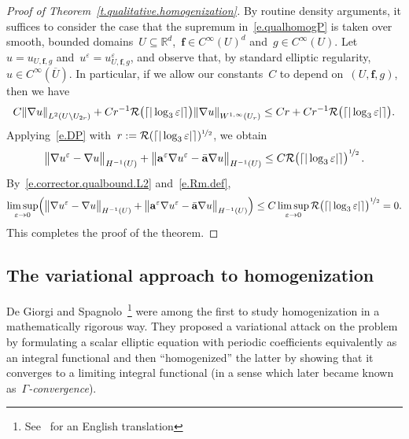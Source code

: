 \documentclass[11pt,twoside]{article} %
\numberwithin{equation}{section}
\theoremstyle{definition}
\let\originalleft\left
\let\originalright\right
\renewcommand{\left}{\mathopen{}\mathclose\bgroup\originalleft}
\renewcommand{\right}{\aftergroup\egroup\originalright}
\newcommand*{\Rd}{\ensuremath{\mathbb{R}^d}}
\newcommand{\eps}{\varepsilon}
\newcommand{\f}{\mathbf{f}}
\newcommand{\ep}{\eps}
\renewcommand{\a}{\mathbf{a}}
\newcommand{\ahom}{\bar{\a}}
\begin{document}
\begin{proof}[{Proof of Theorem~\ref{t.qualitative.homogenization}}]
By routine density arguments, it suffices to consider the case that the supremum in~\eqref{e.qualhomogP} is taken over smooth, bounded domains~$U\subseteq\Rd$,~$\f \in C^\infty(U)^d$ and~$g\in C^\infty(U)$.
Let~$u = u_{U,\f,g}$ and~$u^\ep = u^\ep_{U,\f,g}$, and observe that, by standard elliptic regularity,~$u \in C^\infty(\overline{U})$. In particular, if we allow our constants~$C$ to depend on~$(U,\f,g)$, then we have 
\begin{align*}
C \left\| \nabla u \right\|_{L^{2}(U \setminus U_{2r})} 
+
Cr^{-1} \mathcal{R}\bigl( \lceil |\log_3 \ep| \rceil \bigr) \left\|  \nabla u \right\|_{W^{1,\infty}(U_r)}
\leq 
Cr + Cr^{-1}  \mathcal{R}\bigl( \lceil |\log_3 \ep| \rceil \bigr).
\end{align*}
Applying~\eqref{e.DP} with~$r:= \mathcal{R}(\lceil |\log_3 \ep |\rceil)^{\nicefrac12}$, we obtain 
\begin{align*}
\bigl\| \nabla u^\ep  -\nabla u  \bigr\|_{H^{-1}(U)}
+
\bigl\| \a^\ep \nabla u^\ep  - \ahom \nabla u  \bigr\|_{H^{-1}(U)}
\leq 
C \mathcal{R}\bigl( \lceil |\log_3 \ep| \rceil \bigr)^{\nicefrac12}\,.
\end{align*}
By~\eqref{e.corrector.qualbound.L2} and~\eqref{e.Rm.def}, 
\begin{align*}
\limsup_{\ep\to 0} \Bigl( \bigl\| \nabla u^\ep  -\nabla u  \bigr\|_{H^{-1}(U)}
+
\bigl\| \a^\ep \nabla u^\ep  - \ahom \nabla u  \bigr\|_{H^{-1}(U)} \Bigr)
\leq
C \limsup_{\ep\to 0} \mathcal{R}\bigl( \lceil |\log_3 \ep| \rceil \bigr)^{\nicefrac12} = 0. 
\end{align*}
This completes the proof of the theorem. 
\end{proof}




\subsection{The variational approach to  homogenization}
\label{ss.variational}


De Giorgi and Spagnolo~\cite{DGS}\footnote{See~\cite{DG} for an English translation} were among the first to study homogenization in a mathematically rigorous way. They proposed a variational attack on the problem by formulating a scalar elliptic equation with periodic coefficients equivalently as an integral functional and then ``homogenized'' the latter by showing that it converges to a limiting integral functional (in a sense which later became known as~\emph{$\Gamma$-convergence}). 
\end{document}
